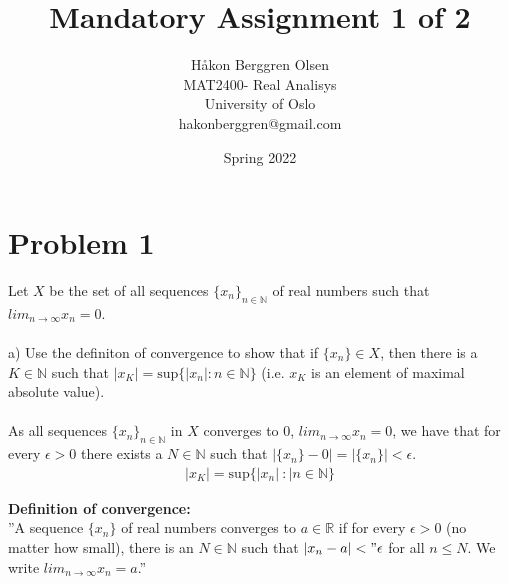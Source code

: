 \documentclass[12pt,letterpaper]{article}
\title{Mandatory Assignment 1 of 2}
\author{Håkon Berggren Olsen\\
  \small{MAT2400- Real Analisys}\\
  \small{University of Oslo}\\
  \small{hakonberggren@gmail.com}
}
\date{Spring 2022}
\begin{document}
\maketitle
\newpage 
 
\section*{Problem 1}
 
 Let $X$ be the set of all sequences $\{x_n\}_{n\in \mathbb{N}}$ of real numbers such that $lim_{n\to \infty} x_n = 0$.\\
 \noindent \\
 a) Use the definiton of convergence to show that if $\{x_n\}\in X$, then there is a $K\in \mathbb{N}$ such that $|x_K|=\text{sup}\{|x_n| : n\in \mathbb{N} \}$ (i.e. $x_K$ is an element of maximal absolute value).\\
 
 \noindent \\
 As all sequences $\{x_n\}_{n\in \mathbb{N}}$ in $X$ converges to $0$, $lim_{n\to \infty} x_n = 0$, we have that for every $\epsilon>0$ there exists a $N\in \mathbb{N}$ such that $|\{x_n\}-0| = |\{x_n\}|<\epsilon$. \\
 
 
 \begin{align*}
 	|x_K| = \text{sup} \{|x_n| \ : | n\in\mathbb{N}   \}
 \end{align*}
 
 
 
 
 \noindent
 \textbf{Definition of convergence:}\\
 ''A sequence $\{x_n\}$ of real numbers converges to $a\in\mathbb{R}$ if for every $\epsilon >0$ (no matter how small), there is an $N\in\mathbb{N}$ such that $|x_n-a|<"\epsilon$ for all $n\le N$. We write $lim_{n \to \infty} x_n = a$.''\\
 
\end{document}
